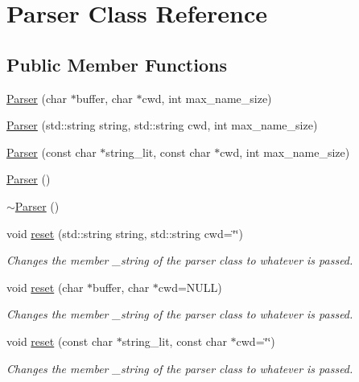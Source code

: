 \hypertarget{classParser}{}\section{Parser Class Reference}
\label{classParser}
\subsection*{Public Member Functions}
\begin{DoxyCompactItemize}
\item 
\hyperlink{classParser_a306c6c33d7a6cf1bb682be360fcfe982}{Parser} (char $\ast$buffer, char $\ast$cwd, int max\+\_\+name\+\_\+size)
\item 
\hyperlink{classParser_ada33680bf5f723ef95c44eeed1bff451}{Parser} (std\+::string string, std\+::string cwd, int max\+\_\+name\+\_\+size)
\item 
\hyperlink{classParser_a5168f5c44e9649e71796f9bef48bdbbe}{Parser} (const char $\ast$string\+\_\+lit, const char $\ast$cwd, int max\+\_\+name\+\_\+size)
\item 
\hyperlink{classParser_a12234f6cd36b61af4b50c94a179422c1}{Parser} ()
\item 
\hyperlink{classParser_a3e658b5917a93a3ef648050d060e3a93}{$\sim$\+Parser} ()
\item 
void \hyperlink{classParser_a87f5e73ca10ef5f84f37a4b37e0e6f59}{reset} (std\+::string string, std\+::string cwd=\char`\"{}\char`\"{})
\begin{DoxyCompactList}\small\item\em Changes the member \+\_\+string of the parser class to whatever is passed. \end{DoxyCompactList}\item 
void \hyperlink{classParser_a5e097c301e171481e8d2af91c112e35e}{reset} (char $\ast$buffer, char $\ast$cwd=N\+U\+LL)
\begin{DoxyCompactList}\small\item\em Changes the member \+\_\+string of the parser class to whatever is passed. \end{DoxyCompactList}\item 
void \hyperlink{classParser_ab51b81b1617f1948205d73804e3c0fb9}{reset} (const char $\ast$string\+\_\+lit, const char $\ast$cwd=\char`\"{}\char`\"{})
\begin{DoxyCompactList}\small\item\em Changes the member \+\_\+string of the parser class to whatever is passed. \end{DoxyCompactList}\item 

\end{DoxyCompactItemize}
